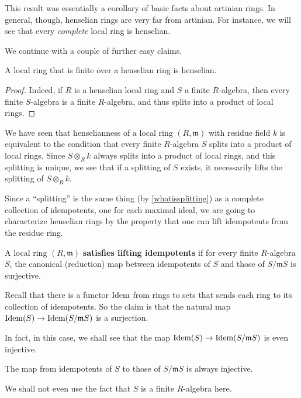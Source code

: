 This result was essentially a corollary of basic facts about artinian
rings. In general, though, henselian rings are very far from artinian. For
instance, we will see that every \emph{complete} local ring is henselian.

We continue with a couple of further easy claims. 
\begin{proposition}  \label{finitehenselian}
A local ring that is finite over a henselian ring is henselian. 
\end{proposition} 
\begin{proof} 
Indeed, if $R$ is a henselian local ring and $S$ a finite $R$-algebra, then
every finite $S$-algebra is a finite $R$-algebra, and thus splits into a product
of local rings.
\end{proof} 

We have seen that henselianness of a local ring $(R, \mathfrak{m})$ with residue
field $k$ is equivalent to the condition that every finite $R$-algebra $S$ splits
into a product of local rings. Since $S \otimes_R k$ always splits into a
product of local rings, and this splitting is unique, we see that if a splitting
of $S$ exists, it necessarily lifts the splitting of $S \otimes_R k$. 

Since a ``splitting'' is the same thing (by \cref{whatissplitting}) as a
complete collection of idempotents, one for each maximal ideal, we are going to
characterize henselian rings by the property that one can lift idempotents from
the residue ring.

\begin{definition}
A local ring $(R, \mathfrak{m})$ \textbf{satisfies lifting
  idempotents} if for every finite $R$-algebra $S$, the canonical
(reduction) map
between idempotents of $S$ and those of $S/\mathfrak{m}S$ is surjective.
\end{definition}

Recall that there is a functor $\operatorname{\text{Idem}}$ from rings to sets that sends each ring
to its collection of idempotents. So the claim is that the natural map $\operatorname{\text{Idem}}(S)
\to \operatorname{\text{Idem}}(S/\mathfrak{m}S)$ is a surjection.

In fact, in this case, we shall see that the map $\operatorname{\text{Idem}}(S) \to
\operatorname{\text{Idem}}(S/\mathfrak{m}S)$ is even injective.
\begin{proposition} 
The map from idempotents of $S$ to those of $S/\mathfrak{m} S$ is
always injective.
\end{proposition}
We shall not even use the fact that $S$ is a finite $R$-algebra here.

